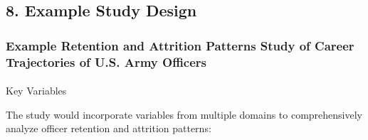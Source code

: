 \documentclass[
  letterpaper,
  DIV=11,
  numbers=noendperiod]{scrartcl}
\makeatletter
\let\oldparagraph\paragraph
\renewcommand{\paragraph}{
    \@ifstar
      \xxxParagraphStar
      \xxxParagraphNoStar
  }
\newcommand{\xxxParagraphStar}[1]{\oldparagraph*{#1}\mbox{}}
\newcommand{\xxxParagraphNoStar}[1]{\oldparagraph{#1}\mbox{}}
\makeatother
\begin{document}
\subsection{8. Example Study Design}\label{example-study-design}

\subsubsection{Example Retention and Attrition Patterns Study of Career
Trajectories of U.S. Army
Officers}\label{example-retention-and-attrition-patterns-study-of-career-trajectories-of-u.s.-army-officers}

\paragraph{Key Variables}\label{key-variables}

The study would incorporate variables from multiple domains to
comprehensively analyze officer retention and attrition patterns:
\end{document}
